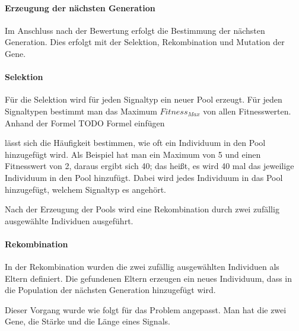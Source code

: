 \paragraph{Erzeugung der n{\"a}chsten Generation}
Im Anschluss nach der Bewertung erfolgt die Bestimmung der n{\"a}chsten Generation. Dies erfolgt mit der Selektion, Rekombination und Mutation der Gene. 

\paragraph{Selektion}
F{\"u}r die Selektion wird f{\"u}r jeden Signaltyp ein neuer Pool erzeugt. 
F{\"u}r jeden Signaltypen bestimmt man das Maximum $Fitness_{Max}$ von allen Fitnesswerten.
Anhand der Formel 
TODO Formel einfügen


l{\"a}sst sich die H{\"a}ufigkeit bestimmen, wie oft ein Individuum in den Pool hinzugef{\"u}gt wird. Als Beispiel hat man ein Maximum von 5 und einen Fitnesswert von 2, daraus ergibt sich 40; das hei{\ss}t, es wird 40 mal das jeweilige Individuum in den Pool hinzuf{\"u}gt. Dabei wird jedes Individuum in das Pool hinzugef{\"u}gt, welchem Signaltyp es angeh{\"o}rt. 

Nach der Erzeugung der Pools wird eine Rekombination durch zwei zuf{\"a}llig ausgew{\"a}hlte Individuen ausgef{\"u}hrt.


\paragraph{Rekombination}
In der Rekombination wurden die zwei zuf{\"a}llig ausgew{\"a}hlten Individuen als Eltern definiert. Die gefundenen Eltern erzeugen ein neues Individuum, dass in die Population der n{\"a}chsten Generation hinzugef{\"u}gt wird. 

Dieser Vorgang wurde wie folgt f{\"u}r das Problem angepasst. Man hat die zwei Gene, die St{\"a}rke und die L{\"a}nge eines Signals.

